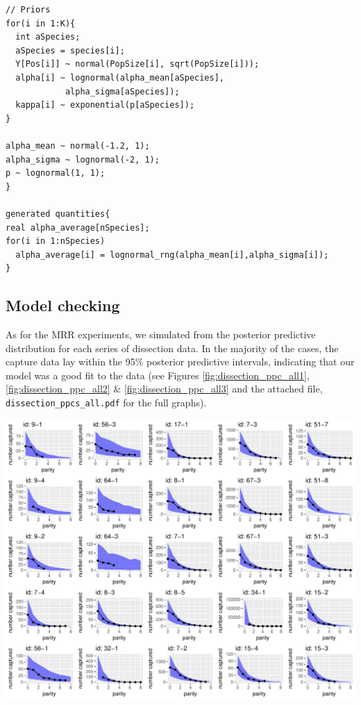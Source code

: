 \documentclass[12pt]{article}
\begin{document}
{\begin{verbatim}
// Priors
for(i in 1:K){
  int aSpecies;
  aSpecies = species[i];
  Y[Pos[i]] ~ normal(PopSize[i], sqrt(PopSize[i]));
  alpha[i] ~ lognormal(alpha_mean[aSpecies],
  			alpha_sigma[aSpecies]);
  kappa[i] ~ exponential(p[aSpecies]);
}

alpha_mean ~ normal(-1.2, 1);
alpha_sigma ~ lognormal(-2, 1);
p ~ lognormal(1, 1);
}

generated quantities{
real alpha_average[nSpecies];
for(i in 1:nSpecies)
  alpha_average[i] = lognormal_rng(alpha_mean[i],alpha_sigma[i]);
}
\end{verbatim}

\subsection{Model checking}
As for the MRR experiments, we simulated from the posterior predictive distribution for each series of dissection data. In the majority of the cases, the capture data lay within the 95\% posterior predictive intervals, indicating that our model was a good fit to the data (see Figures \ref{fig:dissection_ppc_all1}, \ref{fig:dissection_ppc_all2} \&  \ref{fig:dissection_ppc_all3} and the attached file, \verb|dissection_ppcs_all.pdf| for the full graphs).

\thispagestyle{empty}
{%
	\centering
	\includegraphics[page=1,scale=.7]{./Figure_files/dissection_ppcs_all}
	\label{fig:dissection_ppc_all1}
	\par
}
\restoregeometry

}
\end{document}
